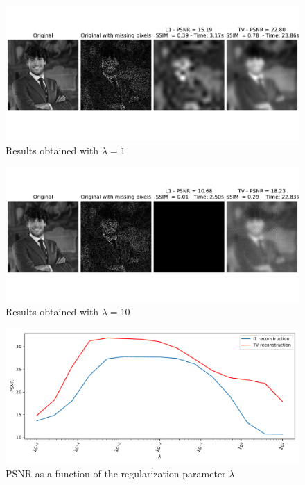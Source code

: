 \documentclass[12pt]{article}
\begin{document}
\begin{figure}
    \centering
    \includegraphics[width=17cm]{hw3/codes/exercise2/results/lambda_search/me_1.pdf}
    \caption{Results obtained with $\lambda = 1$}
    \label{fig:lambda-search-1}
\end{figure}

\begin{figure}
    \centering
    \includegraphics[width=17cm]{hw3/codes/exercise2/results/lambda_search/me_10.pdf}
    \caption{Results obtained with $\lambda = 10$}
    \label{fig:lambda-search-10}
\end{figure}

\begin{figure}
    \centering
    \includegraphics[width=14cm]{hw3/codes/exercise2/results/lambda_search/lambda_search.pdf}
    \caption{PSNR as a function of the regularization parameter $\lambda$}
    \label{fig:lambda-search}
\end{figure}
\end{document}
